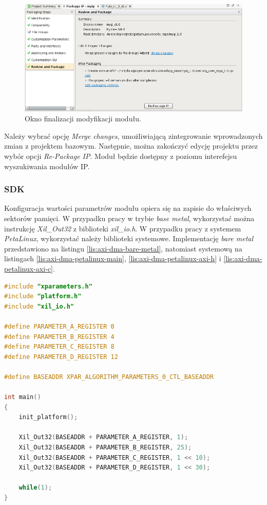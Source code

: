 \begin{figure}[ht]
	\centering
	\includegraphics[width=12cm]{img/vivado/axi-dma-review-package.png}
	\caption{Okno finalizacji modyfikacji modułu.}
	\label{fig:axi-dma-review-package}
\end{figure}

Należy wybrać opcję \emph{Merge changes}, umożliwiającą zintegrowanie wprowadzonych zmian z projektem bazowym. Następnie, można zakończyć edycję projektu przez wybór opcji \emph{Re-Package IP}. Moduł będzie dostępny z poziomu interefejsu wyszukiwania modułów IP.

\subsubsection{SDK}
\label{sec:vivado-axi-dma-sdk}
Konfiguracja wartości parametrów modułu opiera się na zapisie do właściwych sektorów pamięci. W przypadku pracy w trybie \emph{base metal}, wykorzystać można instrukcję \emph{Xil\_Out32} z biblioteki \emph{xil\_io.h}. W przypadku pracy z systemem \emph{PetaLinux}, wykorzystać należy biblioteki systemowe. Implementację \emph{bare metal} przedstawiono na listingu \ref{lis:axi-dma-bare-metal}, natomiast systemową na listingach \ref{lis:axi-dma-petalinux-main}, \ref{lis:axi-dma-petalinux-axi-h} i \ref{lis:axi-dma-petalinux-axi-c}.

\begin{lstlisting}[breaklines, language=C, label=lis:axi-dma-bare-metal, caption=Obsługa modułu w trybie \emph{bare metal}.]
#include "xparameters.h"
#include "platform.h"
#include "xil_io.h"

#define PARAMETER_A_REGISTER 0
#define PARAMETER_B_REGISTER 4
#define PARAMETER_C_REGISTER 8
#define PARAMETER_D_REGISTER 12

#define BASEADDR XPAR_ALGORITHM_PARAMETERS_0_CTL_BASEADDR

int main()
{
	init_platform();
	
	Xil_Out32(BASEADDR + PARAMETER_A_REGISTER, 1);
	Xil_Out32(BASEADDR + PARAMETER_B_REGISTER, 25);
	Xil_Out32(BASEADDR + PARAMETER_C_REGISTER, 1 << 10);
	Xil_Out32(BASEADDR + PARAMETER_D_REGISTER, 1 << 30);
	
	while(1);
}
\end{lstlisting}



